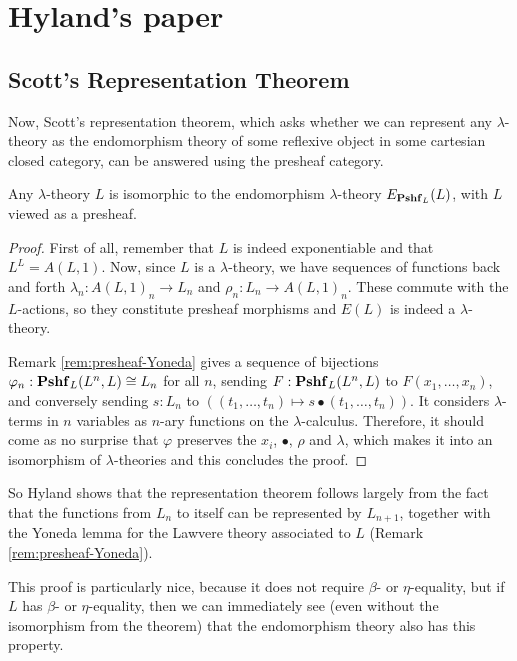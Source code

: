 \chapter{Hyland's paper}\label{ch:the-paper}


\section{Scott's Representation Theorem}

Now, Scott's representation theorem, which asks whether we can represent any $ \lambda $-theory as the endomorphism theory of some reflexive object in some cartesian closed category, can be answered using the presheaf category.
\begin{theorem}\label{thm:representation-theorem}
  Any $ \lambda $-theory $ L $ is isomorphic to the endomorphism $ \lambda $-theory $ E_{\mathbf{Pshf}_{L}}(L) $, with $ L $ viewed as a presheaf.
\end{theorem}
\begin{proof}
  First of all, remember that $ L $ is indeed exponentiable and that $ L^L = A(L, 1) $.
  Now, since $ L $ is a $ \lambda $-theory, we have sequences of functions back and forth $ \lambda_n: A(L, 1)_n \to L_n $ and $ \rho_n: L_n \to A(L, 1)_n $. These commute with the $ L $-actions, so they constitute presheaf morphisms and $ E(L) $ is indeed a $ \lambda $-theory.

  Remark \ref{rem:presheaf-Yoneda} gives a sequence of bijections $ \varphi_n : \mathbf{Pshf}_{L}(L^n, L) \cong L_n $ for all $ n $, sending $ F: \mathbf{Pshf}_{L}(L^n, L) $ to $ F(x_1, \dots, x_n) $, and conversely sending $ s: L_n $ to $ ((t_1, \dots, t_n) \mapsto s \bullet (t_1, \dots, t_n)) $. It considers $ \lambda $-terms in $ n $ variables as $ n $-ary functions on the $ \lambda $-calculus. Therefore, it should come as no surprise that $ \varphi $ preserves the $ x_i $, $ \bullet $, $ \rho $ and $ \lambda $, which makes it into an isomorphism of $ \lambda $-theories and this concludes the proof.
\end{proof}
So Hyland shows that the representation theorem follows largely from the fact that the functions from $ L_n $ to itself can be represented by $ L_{n + 1} $, together with the Yoneda lemma for the Lawvere theory associated to $ L $ (Remark \ref{rem:presheaf-Yoneda}).

This proof is particularly nice, because it does not require $ \beta $- or $ \eta $-equality, but if $ L $ has $ \beta $- or $ \eta $-equality, then we can immediately see (even without the isomorphism from the theorem) that the endomorphism theory also has this property.

